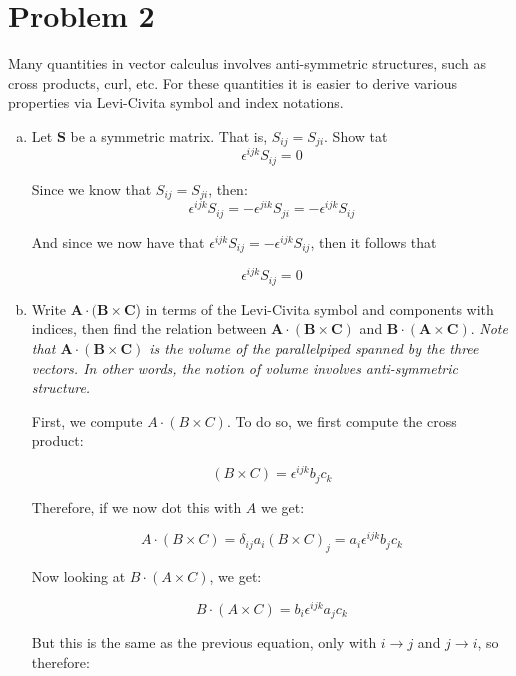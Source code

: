 \documentclass[10pt]{article}
\begin{document}
    \pagebreak

    \section*{Problem 2}
    Many quantities in vector calculus involves anti-symmetric structures, such as cross products, curl, etc. For these quantities it is easier to derive various properties via Levi-Civita symbol and index notations. 

    \begin{enumerate}[(a)]
        \item Let $\mathbf S$ be a symmetric matrix. That is, $S_{ij} = S_{ji}$. Show tat
        \[\epsilon^{ijk} S_{ij} = 0\] 

        \begin{solution}
            Since we know that $S_{ij} = S_{ji}$, then: 
                \[ \epsilon^{ijk}S_{ij} = -\epsilon^{jik}S_{ji}
                = -\epsilon^{ijk}S_{ij} \] 

            And since we now have that $\epsilon^{ijk}S_{ij} = -\epsilon^{ijk}S_{ij}$, then it follows that 

            \[ \epsilon^{ijk}S_{ij} = 0\]
        \end{solution}
        \item Write $\mathbf A \cdot (\mathbf B \times \mathbf C$) in terms of the Levi-Civita symbol and components with indices, then find the relation between $\mathbf {A \cdot (B \times C)}$ and $\mathbf{B \cdot (A \times C)}$. \textit{Note that $\mathbf{A \cdot (B \times C)}$ is the volume of the parallelpiped spanned by the three vectors. In other words, the notion of volume involves anti-symmetric structure.}
        
        \begin{solution}
            First, we compute $A \cdot (B \times C)$. To do so, we first compute the cross product: 

            \[ (B \times C) = \epsilon^{ijk}b_jc_k\] 

            Therefore, if we now dot this with $A$ we get: 

            \[ A \cdot (B \times C) = \delta_{ij} a_i (B \times C)_j = a_i \epsilon^{ijk}b_jc_k\]

            Now looking at $B \cdot (A \times C)$, we get: 

            \[ B \cdot (A \times C) = b_i \epsilon^{ijk} a_jc_k\] 

            But this is the same as the previous equation, only with $i \to j$ and $j \to i$, so therefore: 


\end{solution}
\end{enumerate}
\end{document}
